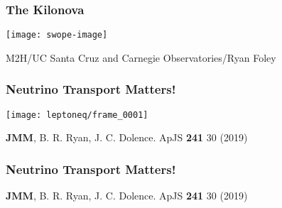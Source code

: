 \documentclass[]{beamer}
\begin{document}
\begin{frame}
  \frametitle{The Kilonova}
  \begin{center}
    \texttt{[image: swope-image]}
  \end{center}
  M2H/UC Santa Cruz and Carnegie Observatories/Ryan Foley
\end{frame}

\begin{frame}
  \frametitle{Neutrino Transport Matters!}
  \begin{center}
    \texttt{[image: leptoneq/frame\_0001]}
  \end{center}
  \begin{tiny}
    \textbf{JMM}, B. R. Ryan, J. C. Dolence. ApJS \textbf{241} 30 (2019) 
  \end{tiny}
\end{frame}

\begin{frame}
  \frametitle{Neutrino Transport Matters!}
  \begin{center}
  \end{center}
  \begin{tiny}
    \textbf{JMM}, B. R. Ryan, J. C. Dolence. ApJS \textbf{241} 30 (2019) 
  \end{tiny}
\end{frame}
\end{document}
